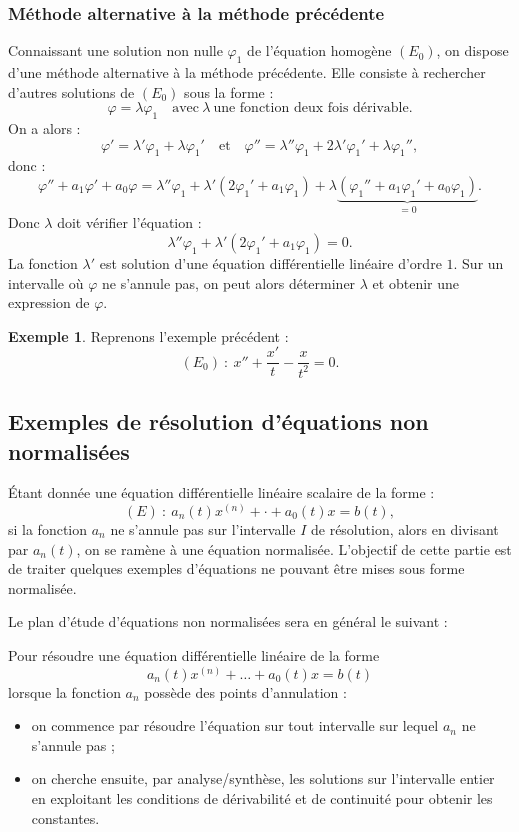 \documentclass[french]{article}
\theoremstyle{plain}
\theoremstyle{definition}
\newtheorem*{ex}{Exemple}
\theoremstyle{remark}
\begin{document}
\subsubsection*{Méthode alternative à la méthode précédente}

Connaissant une solution non nulle $\varphi_1$ de l'équation homogène $(E_0)$, on dispose d'une méthode alternative à la méthode précédente. Elle consiste à rechercher d'autres solutions de $(E_0)$ sous la forme :
$$\varphi=\lambda\varphi_1\quad\text{avec}\ \lambda\ \text{une fonction deux fois dérivable.}$$
On a alors :
$$\varphi'=\lambda'\varphi_1+\lambda\varphi_1'\quad\text{et}\quad\varphi''=\lambda''\varphi_1+2\lambda'\varphi_1'+\lambda\varphi_1'',$$ donc :
$$\varphi''+a_1\varphi'+a_0\varphi=\lambda''\varphi_1+\lambda'(2\varphi_1'+a_1\varphi_1)+\lambda\underbrace{(\varphi_1''+a_1\varphi_1'+a_0\varphi_1)}_{=0}.$$
Donc $\lambda$ doit vérifier l'équation :
$$\lambda''\varphi_1+\lambda'(2\varphi_1'+a_1\varphi_1)=0.$$
La fonction $\lambda'$ est solution d'une équation différentielle linéaire d'ordre $1$. Sur un intervalle où $\varphi$ ne s'annule pas, on peut alors déterminer $\lambda$ et obtenir une expression de $\varphi$.

\begin{ex}
	Reprenons l'exemple précédent :
	$$(E_0)\ :\ x''+\frac{x'}{t}-\frac{x}{t^2}=0.$$
\end{ex}

\subsection{Exemples de résolution d'équations non normalisées}

Étant donnée une équation différentielle linéaire scalaire de la forme :
$$(E)\ :\ a_n(t)x^{(n)}+\cdot+a_0(t)x=b(t),$$ si la fonction $a_n$ ne s'annule pas sur l'intervalle $I$ de résolution, alors en divisant par $a_n(t)$, on se ramène à une équation normalisée. L'objectif de cette partie est de traiter quelques exemples d'équations ne pouvant être mises sous forme normalisée.

Le plan d'étude d'équations non normalisées sera en général le suivant :

\begin{met}
	Pour résoudre une équation différentielle linéaire de la forme $$a_n(t)x^{(n)}+\ldots+a_0(t)x=b(t)$$ lorsque la fonction $a_n$ possède des points d'annulation :
	\begin{itemize}
		\item on commence par résoudre l'équation sur tout intervalle sur lequel $a_n$ ne s'annule pas ;
		\item on cherche ensuite, par analyse/synthèse, les solutions sur l'intervalle entier en exploitant les conditions de dérivabilité et de continuité pour obtenir les constantes.
	\end{itemize}
\end{met}
\end{document}
